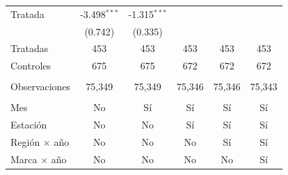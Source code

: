 \begin{tabular}{lccccc}
   Tratada              & -3.498$^{***}$ & -1.315$^{***}$ &                &                &   \\   
                        & (0.742)        & (0.335)        &                &                &   \\   
   Tratadas             & 453            & 453            & 453            & 453            & 453\\  
   Controles            & 675            & 675            & 672            & 672            & 672\\  
    \\
   Observaciones        & 75,349         & 75,349         & 75,346         & 75,346         & 75,343\\  
    \\
   Mes                  & No             & Sí             & Sí             & Sí             & Sí\\  
   Estación             & No             & No             & Sí             & Sí             & Sí\\  
   Región $\times$ año  & No             & No             & No             & Sí             & Sí\\  
   Marca $\times$ año   & No             & No             & No             & No             & Sí\\  
   \bottomrule
\end{tabular}
\par\endgroup


